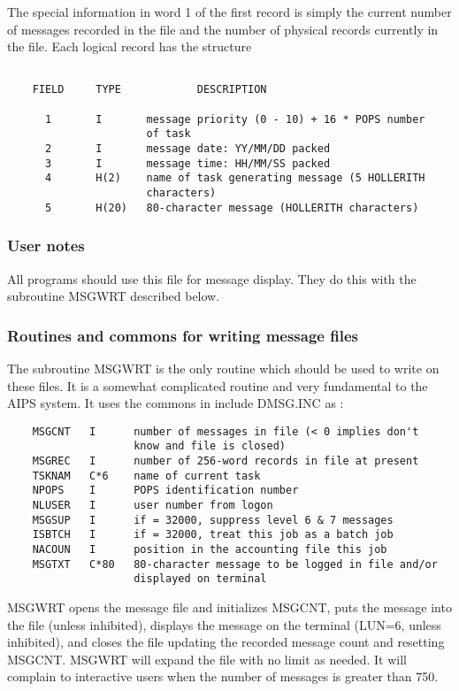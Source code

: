      The special information in word 1 of the first record is simply
the current number of messages recorded in the file and the number
of physical records currently in the file.  Each logical record has
the structure
\begin{verbatim}

    FIELD     TYPE            DESCRIPTION

      1       I       message priority (0 - 10) + 16 * POPS number
                      of task
      2       I       message date: YY/MM/DD packed
      3       I       message time: HH/MM/SS packed
      4       H(2)    name of task generating message (5 HOLLERITH
                      characters)
      5       H(20)   80-character message (HOLLERITH characters)
\end{verbatim}


\subsubsection{User notes}

     All programs should use this file for message display.  They do
this with the subroutine MSGWRT described below.

\subsubsection{Routines and commons for writing message files}


     The subroutine MSGWRT is the only routine which should be used to
write on these files.  It is a somewhat complicated routine and very
fundamental to the AIPS system.  It uses the commons in include DMSG.INC as :
\begin{verbatim}
    MSGCNT   I      number of messages in file (< 0 implies don't
                    know and file is closed)
    MSGREC   I      number of 256-word records in file at present
    TSKNAM   C*6    name of current task
    NPOPS    I      POPS identification number
    NLUSER   I      user number from logon
    MSGSUP   I      if = 32000, suppress level 6 & 7 messages
    ISBTCH   I      if = 32000, treat this job as a batch job
    NACOUN   I      position in the accounting file this job
    MSGTXT   C*80   80-character message to be logged in file and/or
                    displayed on terminal
\end{verbatim}

MSGWRT opens the message file and initializes MSGCNT, puts the message
into the file (unless inhibited), displays the message on the terminal
(LUN=6, unless inhibited), and closes the file updating the recorded
message count and resetting MSGCNT.  MSGWRT will expand the file with
no limit as needed.  It will complain to interactive users when the
number of messages is greater than 750.


